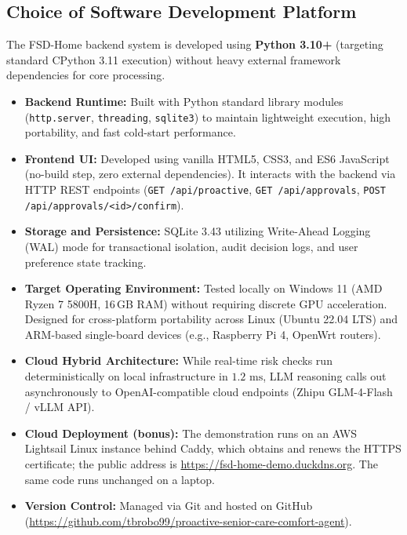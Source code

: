 \documentclass[conference]{IEEEtran}
\begin{document}
\subsection{Choice of Software Development Platform}
The FSD-Home backend system is developed using \textbf{Python 3.10+} (targeting standard CPython 3.11 execution) without heavy external framework dependencies for core processing.
\begin{itemize}
    \item \textbf{Backend Runtime:} Built with Python standard library modules (\texttt{http.server}, \texttt{threading}, \texttt{sqlite3}) to maintain lightweight execution, high portability, and fast cold-start performance.
    \item \textbf{Frontend UI:} Developed using vanilla HTML5, CSS3, and ES6 JavaScript (no-build step, zero external dependencies). It interacts with the backend via HTTP REST endpoints (\texttt{GET /api/proactive}, \texttt{GET /api/approvals}, \texttt{POST /api/approvals/<id>/confirm}).
    \item \textbf{Storage and Persistence:} SQLite 3.43 utilizing Write-Ahead Logging (WAL) mode for transactional isolation, audit decision logs, and user preference state tracking.
    \item \textbf{Target Operating Environment:} Tested locally on Windows 11 (AMD Ryzen 7 5800H, 16\,GB RAM) without requiring discrete GPU acceleration. Designed for cross-platform portability across Linux (Ubuntu 22.04 LTS) and ARM-based single-board devices (e.g., Raspberry Pi 4, OpenWrt routers).
    \item \textbf{Cloud Hybrid Architecture:} While real-time risk checks run deterministically on local infrastructure in $1.2\text{ ms}$, LLM reasoning calls out asynchronously to OpenAI-compatible cloud endpoints (Zhipu GLM-4-Flash / vLLM API).
    \item \textbf{Cloud Deployment (bonus):} The demonstration runs on an AWS Lightsail Linux instance behind Caddy, which obtains and renews the HTTPS certificate; the public address is \url{https://fsd-home-demo.duckdns.org}. The same code runs unchanged on a laptop.
    \item \textbf{Version Control:} Managed via Git and hosted on GitHub (\url{https://github.com/tbrobo99/proactive-senior-care-comfort-agent}).
\end{itemize}
\end{document}
